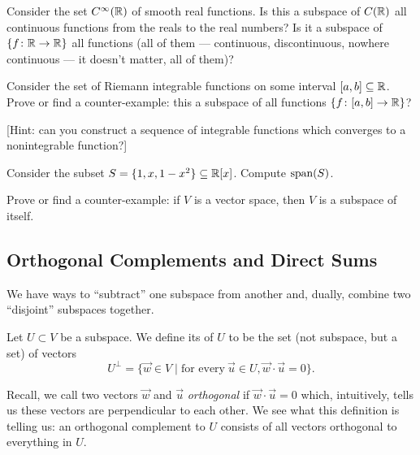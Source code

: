 \begin{exercise}
Consider the set $C^{\infty}(\mathbb{R})$ of smooth real functions.
Is this a subspace of $C(\mathbb{R})$ all continuous functions from the reals
to the real numbers?
Is it a subspace of $\{f\colon\mathbb{R}\to\mathbb{R}\}$ all functions (all of them --- continuous,
discontinuous, nowhere continuous --- it doesn't matter, all of them)?
\end{exercise}

\begin{exercise}
Consider the set of Riemann integrable functions on some interval
$[a,b]\subseteq\mathbb{R}$. Prove or find a counter-example: this a subspace of all functions $\{f\colon[a,b]\to\mathbb{R}\}$?

[Hint: can you construct a sequence of integrable functions which
  converges to a nonintegrable function?]
\end{exercise}

\begin{exercise}
Consider the subset $S = \{1,x,1-x^{2}\}\subseteq\mathbb{R}[x]$. Compute $\operatorname{span}(S)$.
\end{exercise}

\begin{exercise}
Prove or find a counter-example: if $V$ is a vector space, then $V$ is a
subspace of itself.
\end{exercise}

\subsection{Orthogonal Complements and Direct Sums}

\M We have ways to ``subtract'' one subspace from another and, dually,
combine two ``disjoint'' subspaces together.

\begin{definition}
Let $U\subset V$ be a subspace. We define its 
of $U$ to be the set (not subspace, but a set) of vectors
\begin{equation}
U^{\perp} = \{\vec{w}\in V\mid \mbox{for every}~\vec{u}\in U, \vec{w}\cdot\vec{u}=0\}.
\end{equation}
\end{definition}

\begin{remark}
Recall, we call two vectors $\vec{w}$ and $\vec{u}$ \emph{orthogonal}
if $\vec{w}\cdot\vec{u}=0$ which, intuitively, tells us these vectors
are perpendicular to each other.
We see what this definition is telling us: an orthogonal complement to
$U$ consists of all vectors orthogonal to everything in $U$.
\end{remark}

